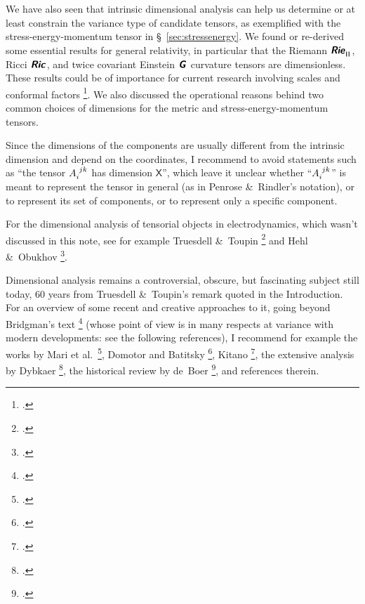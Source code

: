 \documentclass[\ifafour a4paper,12pt,\else a5paper,10pt,\fi%
onecolumn,oneside,article,%
british%
]{memoir}
\makeatletter
\theoremstyle{remark}
\theoremstyle{innote}
\newcommand*{\mathte}[1]{\textbf{\textit{\textsf{#1}}}}
\newcommand*{\citep}{\footcites}
\newcommand*{\amp}{\&}
\renewcommand*{\|}[1][]{\nonscript\,#1\vert\nonscript\;\mathopen{}}
\newcommand*{\sect}{\S}%
\newcommand*{\chap}{ch.}%
\newcommand*{\eg}{{e.g.}}
\newcommand*{\etal}{{et al.}}
\newcommand*{\q}{}%
\DeclareRobustCommand*{\q}{%
  \mathord{\mathpalette\bigcdot@{}}%
}
\newcommand*{\bigcdot@scalefactor}{0.7}
\newcommand*{\bigcdot@widthfactor}{1.5}
\newcommand*{\bigcdot@}[2]{%
  \sbox0{$#1\vcenter{}$}%
  \sbox2{$#1\cdot\m@th$}%
  \hbox to \bigcdot@widthfactor\wd2{%
    \hfil
    \raise\ht0\hbox{%
      \scalebox{\bigcdot@scalefactor}{%
        \lower\ht0\hbox{$#1\bullet\m@th$}%
      }%
    }%
    \hfil
  }%
}
\newcommand*{\Xx}{\textsf{X}}
\newcommand*{\yG}{\mathte{G}}
\newcommand*{\yR}{\mathte{Rie}}
\newcommand*{\yRi}{\mathte{Ric}}
\renewcommand*{\i}{\indices}
\newcommand*{\rul}{{\mkern2mu\rule[-0.1ex]{0.75pt}{1.1ex}\mkern2mu}}
\DeclarePairedDelimiter\mul{\rul}{\rul}%
\makeatother
\begin{document}
We have also seen that intrinsic dimensional analysis can help us determine
or at least constrain the variance type of candidate tensors, as
exemplified with the stress-energy-momentum tensor in
\sect~\ref{sec:stressenergy}. We found or re-derived some essential results
for general relativity, in particular that the Riemann
$\yR\i{^{\q}_{\q\mul{\q\q}}}$, Ricci $\yRi\i{_{\q\q}}$, and twice covariant
Einstein $\yG\i{_{\q\q}}$ curvature tensors are dimensionless. These
results could be of importance for current research involving scales and
conformal factors \citep[\eg][]{roehretal2005,cadonietal2019}. We also
discussed the operational reasons behind two common choices of dimensions
for the metric and stress-energy-momentum tensors.

Since the dimensions of the components are usually different from the
intrinsic dimension and depend on the coordinates, I recommend to avoid
statements such as \enquote{the tensor $A\i{_{i}^{jk}}$ has dimension
  $\Xx$}, which leave it unclear whether \enquote{$A\i{_{i}^{jk}}$} is
meant to represent the tensor in general (as in Penrose \amp\ Rindler's
notation), or to represent its set of components, or to represent only a
specific component.

For the dimensional analysis of tensorial objects in electrodynamics,
which wasn't discussed in this note, see for example Truesdell \amp\ Toupin
\citep[\chap~F]{truesdelletal1960} and Hehl \amp\ Obukhov
\citep{hehletal2003,hehletal2004b}.


\medskip

Dimensional analysis remains a controversial, obscure, but fascinating
subject still today, 60 years from Truesdell \amp\ Toupin's remark quoted
in the Introduction. For an overview of some recent and creative approaches
to it, going beyond Bridgman's text \citep{bridgman1922_r1963} (whose point
of view is in many respects at variance with modern developments: see the
following references), I recommend for example the works by Mari \etal\
\citep{marietal2012,frigerioetal2010}, Domotor and Batitsky
\citep{domotor2017,domotoretal2016,domotor2012}, Kitano \citep{kitano2013},
the extensive analysis by Dybkaer \citep{dybkaer2004_r2010}, the historical
review by de~Boer \citep{deboer1995}, and references therein.


\end{document}
